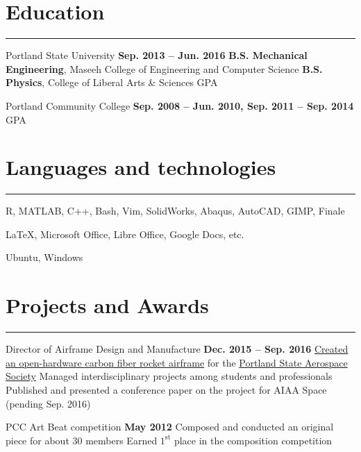\section{Education}
	\noindent\rule{\textwidth}{\hlinewidth}
	\begin{innerlist}
	\item Portland State University		\hfill\textbf{Sep. 2013 -- Jun. 2016}
		\subitem \textbf{B.S. Mechanical Engineering}, Maseeh College of Engineering and Computer Science 
		\subitem\textbf{B.S. Physics}, College of Liberal Arts \& Sciences
		 GPA
	\\
	\item Portland Community College  \hfill\textbf{Sep. 2008 -- Jun. 2010, Sep. 2011 -- Sep. 2014}
		 GPA
	\end{innerlist}
\vfill
\section{Languages and technologies}

\noindent\rule{\textwidth}{\hlinewidth}
    \begin{innerlist}
        \item R, MATLAB, C++, Bash, Vim, SolidWorks, Abaqus, AutoCAD, GIMP, Finale
        \item \LaTeX, Microsoft Office, Libre Office, Google Docs, etc.
	\item Ubuntu, Windows
    \end{innerlist}
\vfill
\section{Projects and Awards}
\noindent\rule{\textwidth}{\hlinewidth}
	\begin{innerlist}
	\item Director of Airframe Design and Manufacture
		\hfill\textbf{Dec. 2015 -- Sep. 2016} %
		\subitem \href{https://github.com/psas/sw-cad-airframe-lv3.0}{Created 
			an open-hardware carbon fiber rocket airframe} for the 
			\href{http://psas.pdx.edu/}{Portland State Aerospace Society}
		\subitem Managed interdisciplinary projects among students and professionals
		\subitem Published and presented a conference paper on the project for AIAA Space (pending Sep. 2016)
	\\
	\item PCC Art Beat competition \hfill\textbf{May 2012}
		\subitem Composed and conducted an original piece for about 30 members
		\subitem Earned $1^\text{st}$ place in the composition competition
	\end{innerlist}
\vfill
